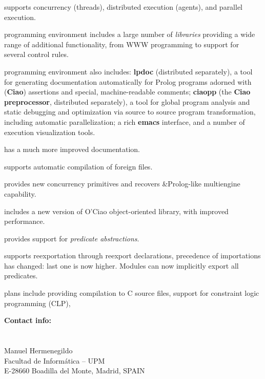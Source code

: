 \documentclass{article}
\newcommand{\inbf}[1]{{\bf #1}}
\newcommand{\enfat}[1]{{\em #1}}
\newcommand{\apl}[1]{{\bf #1}}
\newcommand{\concept}[1]{{\em #1}}
\begin{document}
 supports concurrency (threads), distributed execution (agents),
      and parallel execution.

 programming environment includes a large number of
      \enfat{libraries} providing a wide range of additional
      functionality, from WWW programming to support for several
      control rules.

 programming environment also includes:
      \apl{lpdoc} (distributed separately), a tool for generating
      documentation automatically 
      for Prolog programs adorned with (\inbf{Ciao}) assertions and
      special, machine-readable comments;
      \apl{ciaopp} (the \inbf{Ciao preprocessor}, distributed separately),
      a tool for global program analysis and static debugging and
      optimization via source to source program transformation, including
      automatic parallelization;
      a rich \apl{emacs} interface, and a number of execution
      visualization tools. 

\vfill
\noindent{\large\bf \ldots 1.4\ldots}

 has a much more improved documentation.

 supports automatic compilation of foreign files.

 provides new concurrency primitives and recovers \&Prolog-like 
 multiengine capability. 

 includes a new version of O'Ciao object-oriented library, with
 improved performance. 

 provides support for {\em predicate abstractions}.

 supports reexportation through reexport declarations, precedence of
 importations has changed: last one is now higher. 
 Modules can now implicitly export all predicates.

\vfill
{}

 plans include providing compilation to C source files, support for
constraint logic programming (CLP),

\vfill


\vfill

\noindent
{\bf Contact info:}
\ \\
    \\ 
    \\ 
    Manuel Hermenegildo\\
    Facultad de Inform\'{a}tica -- UPM\\
    E-28660 Boadilla del Monte, Madrid, SPAIN
\end{document}
